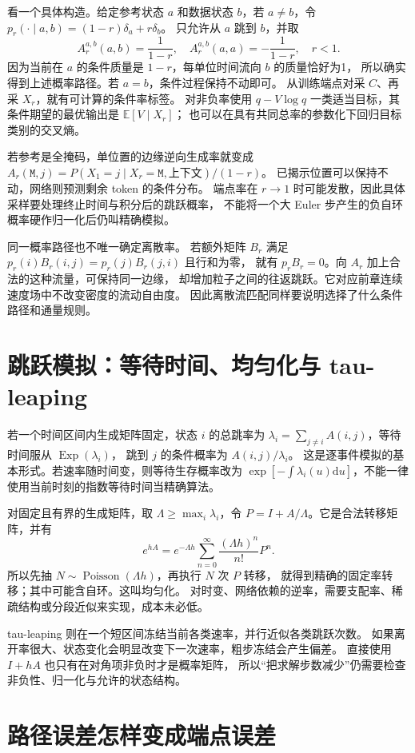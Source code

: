 看一个具体构造。给定参考状态 $a$ 和数据状态 $b$，若 $a\ne b$，令
$p_r(\cdot\mid a,b)=(1-r)\delta_a+r\delta_b$。
只允许从 $a$ 跳到 $b$，并取
\[
A_r^{a,b}(a,b)=\frac1{1-r},\quad
A_r^{a,b}(a,a)=-\frac1{1-r},\quad r<1.
\]
因为当前在 $a$ 的条件质量是 $1-r$，每单位时间流向 $b$ 的质量恰好为1，
所以确实得到上述概率路径。若 $a=b$，条件过程保持不动即可。
从训练端点对采 $C$、再采 $X_r$，就有可计算的条件率标签。
对非负率使用 $q-V\log q$ 一类适当目标，其条件期望的最优输出是 $\mathbb E[V\mid X_r]$；
也可以在具有共同总率的参数化下回归目标类别的交叉熵。

若参考是全掩码，单位置的边缘逆向生成率就变成
$A_r(\mathtt M,j)=P(X_1=j\mid X_r=\mathtt M,\text{上下文})/(1-r)$。
已揭示位置可以保持不动，网络则预测剩余 token 的条件分布。
端点率在 $r\to1$ 时可能发散，因此具体采样要处理终止时间与积分后的跳跃概率，
不能将一个大 Euler 步产生的负自环概率硬作归一化后仍叫精确模拟。

同一概率路径也不唯一确定离散率。
若额外矩阵 $B_r$ 满足 $p_r(i)B_r(i,j)=p_r(j)B_r(j,i)$ 且行和为零，
就有 $p_rB_r=0$。向 $A_r$ 加上合法的这种流量，可保持同一边缘，
却增加粒子之间的往返跳跃。它对应前章连续速度场中不改变密度的流动自由度。
因此离散流匹配同样要说明选择了什么条件路径和通量规则。\cite{theorybook}

\section{跳跃模拟：等待时间、均匀化与 tau-leaping}
若一个时间区间内生成矩阵固定，状态 $i$ 的总跳率为
$\lambda_i=\sum_{j\ne i}A(i,j)$，等待时间服从 $\operatorname{Exp}(\lambda_i)$，
跳到 $j$ 的条件概率为 $A(i,j)/\lambda_i$。
这是逐事件模拟的基本形式。若速率随时间变，则等待生存概率改为
$\exp[-\int\lambda_i(u)\mathrm du]$，不能一律使用当前时刻的指数等待时间当精确算法。

对固定且有界的生成矩阵，取 $\Lambda\geq\max_i\lambda_i$，令
$P=I+A/\Lambda$。它是合法转移矩阵，并有
\[
e^{hA}=e^{-\Lambda h}\sum_{n=0}^{\infty}
 \frac{(\Lambda h)^n}{n!}P^n.
\]
所以先抽 $N\sim\operatorname{Poisson}(\Lambda h)$，再执行 $N$ 次 $P$ 转移，
就得到精确的固定率转移；其中可能含自环。这叫均匀化。
对时变、网络依赖的逆率，需要支配率、稀疏结构或分段近似来实现，成本未必低。

tau-leaping 则在一个短区间冻结当前各类速率，并行近似各类跳跃次数。
如果离开率很大、状态变化会明显改变下一次速率，粗步冻结会产生偏差。
直接使用 $I+hA$ 也只有在对角项非负时才是概率矩阵，
所以“把求解步数减少”仍需要检查非负性、归一化与允许的状态结构。

\section{路径误差怎样变成端点误差}
